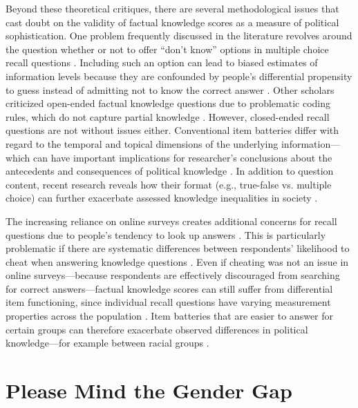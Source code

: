 Beyond these theoretical critiques, there are several methodological issues that cast doubt on the validity of factual knowledge scores as a measure of political sophistication. One problem frequently discussed in the literature revolves around the question whether or not to offer ``don't know'' options in multiple choice recall questions \citep{mondak2000reconsidering,mondak2001asked,miller2008experimenting}. Including such an option can lead to biased estimates of information levels because they are confounded by people's differential propensity to guess instead of admitting not to know the correct answer \citep[but see][]{luskin2011don}. Other scholars criticized open-ended factual knowledge questions due to problematic coding rules, which do not capture partial knowledge \citep{mondak2001developing,krosnick2008problems,gibson2009knowing,debell2013harder}. However, closed-ended recall questions are not without issues either. Conventional item batteries differ with regard to the temporal and topical dimensions of the underlying information---which can have important implications for researcher's conclusions about the antecedents and consequences of political knowledge \citep{barabas2014question}. In addition to question content, recent research reveals how their format (e.g., true-false vs. multiple choice) can further exacerbate assessed knowledge inequalities in society \citep{fraile2020unpacking}.

The increasing reliance on online surveys creates additional concerns for recall questions due to people's tendency to look up answers \citep{clifford2016cheating,hohne2020looking}. This is particularly problematic if there are systematic differences between respondents' likelihood to cheat when answering knowledge questions \citep{style2020does}. Even if cheating was not an issue in online surveys---because respondents are effectively discouraged from searching for correct answers---factual knowledge scores can still suffer from differential item functioning, since individual recall questions have varying measurement properties across the population \citep{pietryka2013analysis}. Item batteries that are easier to answer for certain groups can therefore exacerbate observed differences in political knowledge---for example between racial groups \citep{abrajano2014reexamining}.



\section*{Please Mind the Gender Gap}

